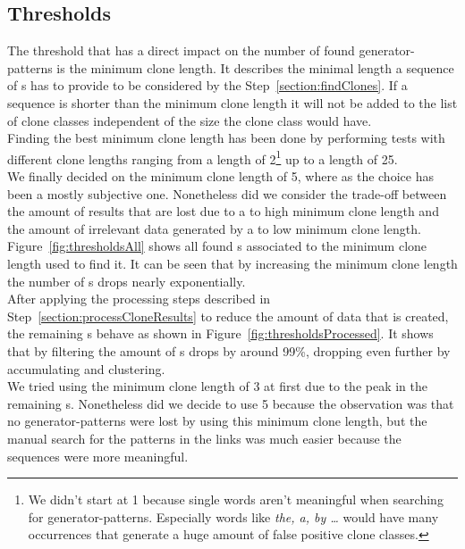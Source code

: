 \subsection{Thresholds}
The threshold that has a direct impact on the number of found generator-patterns is the minimum clone length. It describes the minimal length a sequence of s has to provide to be considered by the Step~\ref{section:findClones}. If a sequence is shorter than the minimum clone length it will not be added to the list of clone classes independent of the size the clone class would have.\\
Finding the best minimum clone length has been done by performing tests with different clone lengths ranging from a length of 2\footnote{We didn't start at 1 because single words aren't meaningful when searching for generator-patterns. Especially words like \textit{the, a, by \dots} would have many occurrences that generate a huge amount of false positive clone classes.} up to a length of 25.\\
We finally decided on the minimum clone length of 5, where as the choice has been a mostly subjective one. Nonetheless did we consider the trade-off between the amount of results that are lost due to a to high minimum clone length and the amount of irrelevant data generated by a to low minimum clone length.\\
Figure~\ref{fig:thresholdsAll} shows all found s associated to the minimum clone length used to find it. It can be seen that by increasing the minimum clone length the number of s drops nearly exponentially. \\
After applying the processing steps described in Step~\ref{section:processCloneResults} to reduce the amount of data that is created, the remaining s behave as shown in Figure~\ref{fig:thresholdsProcessed}. It shows that by filtering the amount of s drops by around 99\%, dropping even further by accumulating and clustering.\\
We tried using the minimum clone length of 3 at first due to the peak in the remaining s. Nonetheless did we decide to use 5 because the observation was that no generator-patterns were lost by using this minimum clone length, but the manual search for the patterns in the links was much easier because the sequences were more meaningful.



